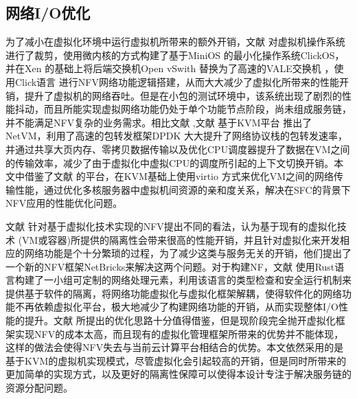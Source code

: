 \subsection{网络I/O优化}
为了减小在虚拟化环境中运行虚拟机所带来的额外开销，文献  对虚拟机操作系统进行了裁剪，使用微内核的方式构建了基于MiniOS \cite{popuri2014tour} 的最小化操作系统ClickOS，并在Xen \cite{barham2003xen} 的基础上将后端交换机Open vSwith \cite{pfaff2015design} 替换为了高速的VALE交换机 \cite{rizzo2012netmap} ，使用Click语言 \cite{kohler2000click} 进行NFV网络功能逻辑搭建，从而大大减少了虚拟化所带来的性能开销，提升了虚拟机的网络吞吐。但是在小包的测试环境中，该系统出现了剧烈的性能抖动，而且所能实现虚拟网络功能仍处于单个功能节点阶段，尚未组成服务链，并不能满足NFV复杂的业务需求。相比文献  ,文献  基于KVM平台 \cite{kivity2007kvm} 推出了NetVM，利用了高速的包转发框架DPDK \cite{intel2015data} 大大提升了网络协议栈的包转发速率，并通过共享大页内存、零拷贝数据传输以及优化CPU调度器提升了数据在VM之间的传输效率，减少了由于虚拟化中虚拟CPU的调度所引起的上下文切换开销。本文中借鉴了文献  的平台，在KVM基础上使用virtio \cite{russell2008virtio} 方式来优化VM之间的网络传输性能，通过优化多核服务器中虚拟机间资源的亲和度关系，解决在SFC的背景下NFV应用的性能优化问题。

文献  针对基于虚拟化技术实现的NFV提出不同的看法，认为基于现有的虚拟化技术 (VM或容器)所提供的隔离性会带来很高的性能开销，并且针对虚拟化来开发相应的网络功能是个十分繁琐的过程，为了减少这类与服务无关的开销，他们提出了一个新的NFV框架NetBricks来解决这两个问题。对于构建NF，文献  使用Rust语言构建了一小组可定制的网络处理元素，利用该语言的类型检查和安全运行机制来提供基于软件的隔离，将网络功能虚拟化与虚拟化框架解耦，使得软件化的网络功能不再依赖虚拟化平台，极大地减少了构建网络功能的开销，从而实现整体I/O性能的提升。文献  所提出的优化思路十分值得借鉴，但是现阶段完全抛开虚拟化框架实现NFV的成本太高，而且现有的虚拟化管理框架所带来的优势并不能体现，这样的做法会使得NFV失去与当前云计算平台相结合的优势。本文依然采用的是基于KVM的虚拟机实现模式，尽管虚拟化会引起较高的开销，但是同时所带来的更加简单的实现方式，以及更好的隔离性保障可以使得本设计专注于解决服务链的资源分配问题。


